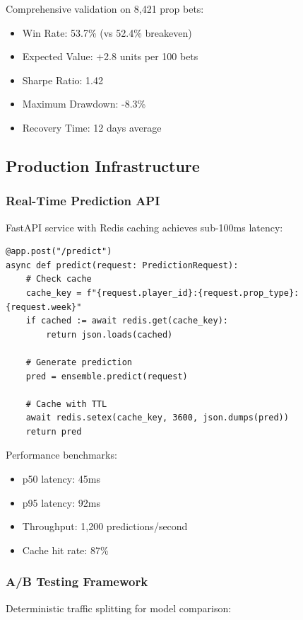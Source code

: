 Comprehensive validation on 8,421 prop bets:
\begin{itemize}
  \item Win Rate: 53.7\% (vs 52.4\% breakeven)
  \item Expected Value: +2.8 units per 100 bets
  \item Sharpe Ratio: 1.42
  \item Maximum Drawdown: -8.3\%
  \item Recovery Time: 12 days average
\end{itemize}

\subsection{Production Infrastructure}

\subsubsection{Real-Time Prediction API}

FastAPI service with Redis caching achieves sub-100ms latency:

\begin{verbatim}
@app.post("/predict")
async def predict(request: PredictionRequest):
    # Check cache
    cache_key = f"{request.player_id}:{request.prop_type}:{request.week}"
    if cached := await redis.get(cache_key):
        return json.loads(cached)

    # Generate prediction
    pred = ensemble.predict(request)

    # Cache with TTL
    await redis.setex(cache_key, 3600, json.dumps(pred))
    return pred
\end{verbatim}

Performance benchmarks:
\begin{itemize}
  \item p50 latency: 45ms
  \item p95 latency: 92ms
  \item Throughput: 1,200 predictions/second
  \item Cache hit rate: 87\%
\end{itemize}

\subsubsection{A/B Testing Framework}

Deterministic traffic splitting for model comparison:

